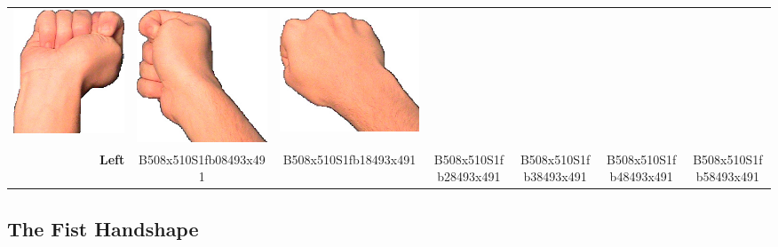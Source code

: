 \documentclass{article}
\begin{document}
\begin{center}
\begin{tabular}{r*{6}{c}}
\includegraphics[scale=0.1]{images/10-05-4.jpg}&
\includegraphics[scale=0.1]{images/10-05-5.jpg}&
\includegraphics[scale=0.1]{images/10-05-6.jpg}\\
\textbf{Left}&
B508x510S1fb08493x491&
B508x510S1fb18493x491&
B508x510S1fb28493x491&
B508x510S1fb38493x491&
B508x510S1fb48493x491&
B508x510S1fb58493x491\\
\end{tabular}
\end{center}

\subsection{The Fist Handshape}
\end{document}

